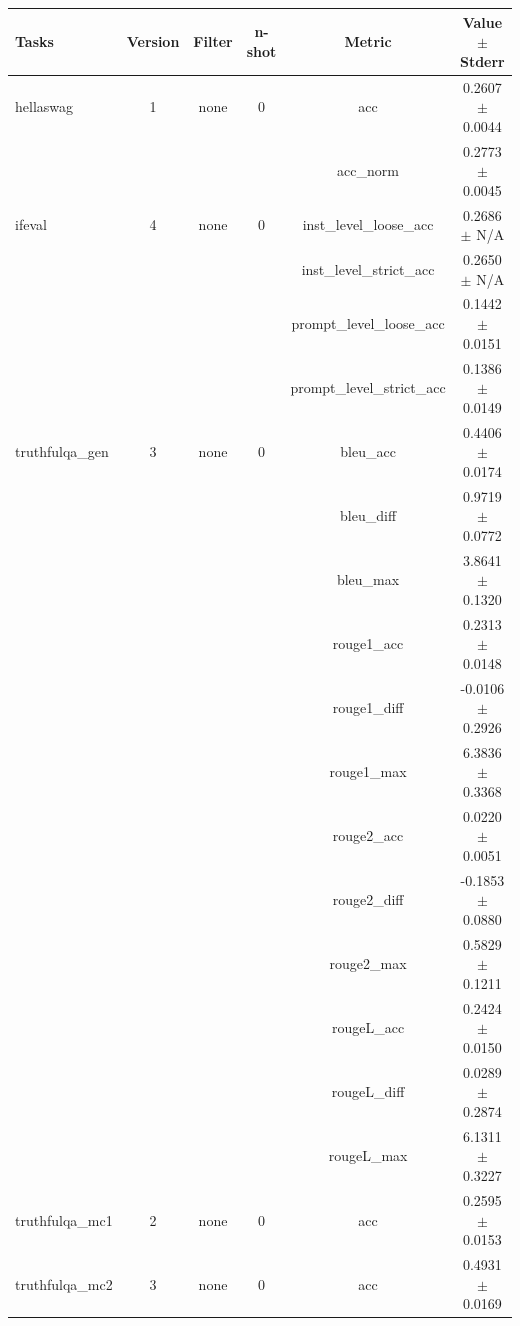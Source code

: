 \documentclass{ifacconf}
\begin{document}
\begin{strip}
\begin{minipage}{\textwidth}
    \begin{table}[H]
    \centering
    \begin{tabular}{|l|c|c|c|c|c|}
    \hline
    \textbf{Tasks} & \textbf{Version} & \textbf{Filter} & \textbf{n-shot} & \textbf{Metric} & \textbf{Value} $\pm$ \textbf{Stderr} \\ \hline
    hellaswag & 1 & none & 0 & acc & 0.2607 $\pm$ 0.0044 \\ \hline
    & & & & acc\_norm & 0.2773 $\pm$ 0.0045 \\ \hline
    ifeval & 4 & none & 0 & inst\_level\_loose\_acc & 0.2686 $\pm$ N/A \\ \hline
    & & & & inst\_level\_strict\_acc & 0.2650 $\pm$ N/A \\ \hline
    & & & & prompt\_level\_loose\_acc & 0.1442 $\pm$ 0.0151 \\ \hline
    & & & & prompt\_level\_strict\_acc & 0.1386 $\pm$ 0.0149 \\ \hline
    truthfulqa\_gen & 3 & none & 0 & bleu\_acc & 0.4406 $\pm$ 0.0174 \\ \hline
    & & & & bleu\_diff & 0.9719 $\pm$ 0.0772 \\ \hline
    & & & & bleu\_max & 3.8641 $\pm$ 0.1320 \\ \hline
    & & & & rouge1\_acc & 0.2313 $\pm$ 0.0148 \\ \hline
    & & & & rouge1\_diff & -0.0106 $\pm$ 0.2926 \\ \hline
    & & & & rouge1\_max & 6.3836 $\pm$ 0.3368 \\ \hline
    & & & & rouge2\_acc & 0.0220 $\pm$ 0.0051 \\ \hline
    & & & & rouge2\_diff & -0.1853 $\pm$ 0.0880 \\ \hline
    & & & & rouge2\_max & 0.5829 $\pm$ 0.1211 \\ \hline
    & & & & rougeL\_acc & 0.2424 $\pm$ 0.0150 \\ \hline
    & & & & rougeL\_diff & 0.0289 $\pm$ 0.2874 \\ \hline
    & & & & rougeL\_max & 6.1311 $\pm$ 0.3227 \\ \hline
    truthfulqa\_mc1 & 2 & none & 0 & acc & 0.2595 $\pm$ 0.0153 \\ \hline
    truthfulqa\_mc2 & 3 & none & 0 & acc & 0.4931 $\pm$ 0.0169 \\ \hline
    \end{tabular}
    \label{tab:qwen25_q8}
    \end{table}
\end{minipage}
\end{strip}
\end{document}
